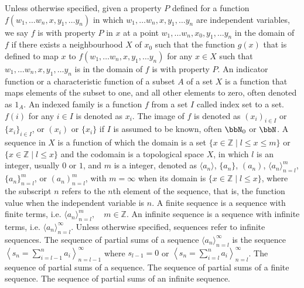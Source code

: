 \documentclass[a4paper,12pt]{article}
\begin{document}
Unless otherwise specified, given a property $P$ defined for a function $f(w_1,\dots w_n,x,y_1,\dots y_n)$ in which $w_1,\dots w_n,x,y_1,\dots y_n$ are independent variables, we say $f$ is with property $P$ in $x$ at a point $w_1,\dots w_n,x_0,y_1,\dots y_n$ in the domain of $f$ if there exists a neighbourhood $X$ of $x_0$ such that the function $g(x)$ that is defined to map $x$ to $f(w_1,\dots w_n,x,y_1,\dots y_n)$ for any $x\in X$ such that $w_1,\dots w_n,x,y_1,\dots y_n$ is in the domain of $f$ is with property $P$.
An indicator function or a characteristic function of a subset $A$ of a set $X$ is a function that maps elements of the subset to one, and all other elements to zero, often denoted as $1_A$.
An indexed family is a function $f$ from a set $I$ called index set to a set. $f(i)$ for any $i\in I$ is denoted as $x_i$. The image of $f$ is denoted as $(x_i)_{i\in I}$ or $\{x_i\}_{i\in I}$, or $(x_i)$ or $\{x_i\}$ if $I$ is assumed to be known, often $\bbN_0$ or $\bbN$.
A sequence in $X$ is a function of which the domain is a set $\{x\in\mathbb{Z}\mid l\leq x\leq m\}$ or $\{x\in\mathbb{Z}\mid l\leq x\}$ and the codomain is a topological space $X$, in which $l$ is an integer, usually $0$ or $1$, and $m$ is a integer, denoted as $\langle a_n\rangle$, $\{a_n\}$, $(a_n)$, $\langle a_n\rangle_{n=l}^m$, $\{a_n\}_{n=l}^m$, or $(a_n)_{n=l}^m$, with $m=\infty$ when its domain is $\{x\in\mathbb{Z}\mid l\leq x\}$, where the subscript $n$ refers to the $n$th element of the sequence, that is, the function value when the  independent variable is $n$.
A finite sequence is a sequence with finite terms, i.e. $\langle a_n\rangle_{n=l}^m,\quad m\in\mathbb{Z}$.
An infinite sequence is a sequence with infinite terms, i.e. $\langle a_n\rangle_{n=l}^\infty$. Unless otherwise specified, sequences refer to infinite sequences.
The sequence of partial sums of a sequence $\langle a_n\rangle_{n=l}^{\infty}$ is the sequence $\left\langle s_n=\sum_{i=l-1}^na_i\right\rangle_{n=l-1}^{\infty}$ where $s_{l-1}=0$ or $\left\langle s_n=\sum_{i=l}^na_i\right\rangle_{n=l}^{\infty}$.
The sequence of partial sums of a sequence.
The sequence of partial sums of a finite sequence.
The sequence of partial sums of an infinite sequence.
\end{document}
